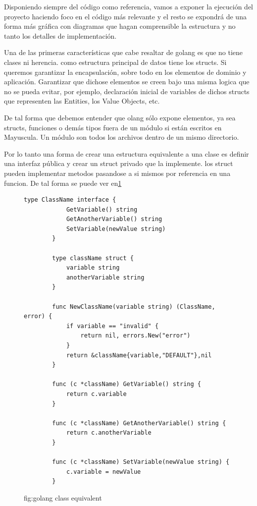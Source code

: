 
Disponiendo siempre del código como referencia, vamos a exponer la ejecución del proyecto haciendo foco en el código más relevante y el resto se expondrá de una forma más gráfica con diagramas que hagan comprensible la estructura y no tanto los detalles de implementación.

Una de las primeras características que cabe resaltar de golang es que no tiene clases ni herencia. como estructura
principal de datos tiene los structs. Si queremos garantizar la encapsulación, sobre todo en los elementos de dominio y aplicación. Garantizar que dichose elementos  se creen bajo una misma logica que no se pueda evitar, por ejemplo, declaración inicial de variables de dichos structs que representen las Entities, los Value Objects, etc.

De tal forma que debemos entender que olang sólo expone elementos, ya sea structs, funciones o demás tipos fuera de un módulo si están escritos en Mayuscula. Un módulo son todos los archivos dentro de un mismo directorio.

Por lo tanto una forma de crear una estructura equivalente a una clase es definir una interfaz pública y crear un struct privado que la implemente. los struct pueden implementar metodos pasandose a si mismos por referencia en una funcion. De tal forma se puede ver en\ref{fig:golang class equivalent}

\begin{figure}[H]
    \centering
    \begin{lstlisting}[label={lst:lstlisting}]
        type ClassName interface {
            GetVariable() string
            GetAnotherVariable() string
            SetVariable(newValue string)
        }

        type className struct {
            variable string
            anotherVariable string
        }

        func NewClassName(variable string) (ClassName, error) {
            if variable == "invalid" {
                return nil, errors.New("error")
            }
            return &className{variable,"DEFAULT"},nil
        }

        func (c *className) GetVariable() string {
            return c.variable
        }

        func (c *className) GetAnotherVariable() string {
            return c.anotherVariable
        }

        func (c *className) SetVariable(newValue string) {
            c.variable = newValue
        }
    \end{lstlisting}
    \caption{fig:golang class equivalent}\label{fig:golang class equivalent}
\end{figure}


